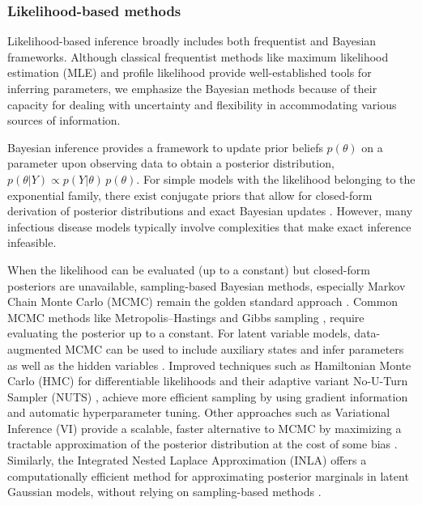 \documentclass{article}
\begin{document}
\subsubsection{Likelihood-based methods}
Likelihood-based inference broadly includes both frequentist and Bayesian frameworks. Although classical frequentist methods like maximum likelihood estimation (MLE)\citep{myung2003tutorial, baltazar2024maximum} and profile likelihood \citep{tonsing2018profile, plank2024structured} provide well-established tools for inferring parameters, we emphasize the Bayesian methods because of their capacity for dealing with uncertainty and flexibility in accommodating various sources of information.

Bayesian inference provides a framework to update prior beliefs $ p(\theta)$ on a parameter upon observing data to obtain a posterior distribution, $p(\theta | Y) \propto p(Y|\theta) \,p(\theta)$. For simple models with the likelihood belonging to the exponential family, there exist conjugate priors that allow for closed-form derivation of posterior distributions and exact Bayesian updates \citep{gelman1995bayesian, lawson2018bayesian, cori2013new}. However, many infectious disease models typically involve complexities that make exact inference infeasible.

When the likelihood can be evaluated (up to a constant) but closed-form posteriors are unavailable, sampling-based Bayesian methods, especially Markov Chain Monte Carlo (MCMC) remain the golden standard approach \citep{gilks1995markov, lekone2006statistical}. Common MCMC methods like Metropolis–Hastings \citep{hastings1970monte} and Gibbs sampling \citep{geman1984stochastic}, require evaluating the posterior up to a constant. For latent variable models, data-augmented MCMC can be used to include auxiliary states and infer parameters as well as the hidden variables \citep{o1999bayesian}. Improved techniques such as Hamiltonian Monte Carlo (HMC) for differentiable likelihoods \citep{duane1987hybrid} and their adaptive variant No-U-Turn Sampler (NUTS) \citep{hoffman2014no, andrade2020evaluation}, achieve more efficient sampling by using gradient information and automatic hyperparameter tuning. Other approaches such as Variational Inference (VI) provide a scalable, faster alternative to MCMC by maximizing a tractable approximation of the posterior distribution at the cost of some bias \citep{blei2017variational, chatzilena2019contemporary}. Similarly, the Integrated Nested Laplace Approximation (INLA) offers a computationally efficient method for approximating posterior marginals in latent Gaussian models, without relying on sampling-based methods \citep{rue2017bayesian}.
\end{document}
